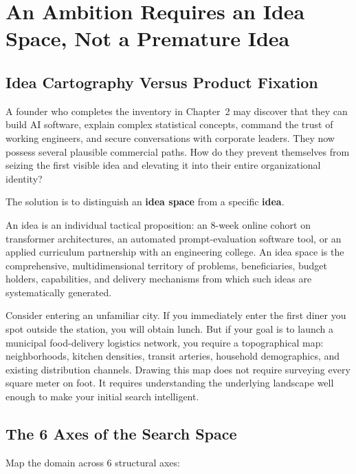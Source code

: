 \section{An Ambition Requires an Idea Space, Not a Premature Idea}

\subsection{Idea Cartography Versus Product Fixation}

A founder who completes the inventory in Chapter~2 may discover that they can build AI software, explain complex statistical concepts, command the trust of working engineers, and secure conversations with corporate leaders. They now possess several plausible commercial paths. How do they prevent themselves from seizing the first visible idea and elevating it into their entire organizational identity?

The solution is to distinguish an \textbf{idea space} from a specific \textbf{idea}.

An idea is an individual tactical proposition: an 8-week online cohort on transformer architectures, an automated prompt-evaluation software tool, or an applied curriculum partnership with an engineering college. An idea space is the comprehensive, multidimensional territory of problems, beneficiaries, budget holders, capabilities, and delivery mechanisms from which such ideas are systematically generated.

Consider entering an unfamiliar city. If you immediately enter the first diner you spot outside the station, you will obtain lunch. But if your goal is to launch a municipal food-delivery logistics network, you require a topographical map: neighborhoods, kitchen densities, transit arteries, household demographics, and existing distribution channels. Drawing this map does not require surveying every square meter on foot. It requires understanding the underlying landscape well enough to make your initial search intelligent.

\subsection{The 6 Axes of the Search Space}

Map the domain across 6 structural axes:

